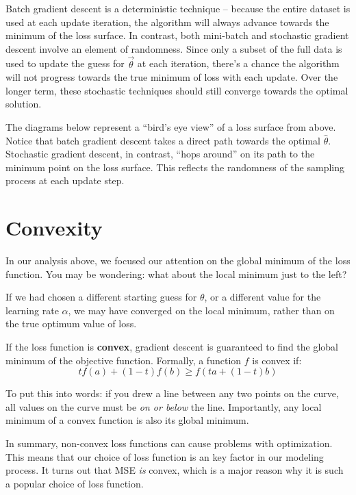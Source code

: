 \documentclass[
  letterpaper,
  DIV=11,
  numbers=noendperiod]{scrreprt}
\begin{document}
Batch gradient descent is a deterministic technique -- because the
entire dataset is used at each update iteration, the algorithm will
always advance towards the minimum of the loss surface. In contrast,
both mini-batch and stochastic gradient descent involve an element of
randomness. Since only a subset of the full data is used to update the
guess for \(\vec{\theta}\) at each iteration, there's a chance the
algorithm will not progress towards the true minimum of loss with each
update. Over the longer term, these stochastic techniques should still
converge towards the optimal solution.

The diagrams below represent a ``bird's eye view'' of a loss surface
from above. Notice that batch gradient descent takes a direct path
towards the optimal \(\hat{\theta}\). Stochastic gradient descent, in
contrast, ``hops around'' on its path to the minimum point on the loss
surface. This reflects the randomness of the sampling process at each
update step.

\hypertarget{convexity}{%
\section{Convexity}\label{convexity}}

In our analysis above, we focused our attention on the global minimum of
the loss function. You may be wondering: what about the local minimum
just to the left?

If we had chosen a different starting guess for \(\theta\), or a
different value for the learning rate \(\alpha\), we may have converged
on the local minimum, rather than on the true optimum value of loss.

If the loss function is \textbf{convex}, gradient descent is guaranteed
to find the global minimum of the objective function. Formally, a
function \(f\) is convex if: \[tf(a) + (1-t)f(b) \geq f(ta + (1-t)b)\]

To put this into words: if you drew a line between any two points on the
curve, all values on the curve must be \emph{on or below} the line.
Importantly, any local minimum of a convex function is also its global
minimum.

In summary, non-convex loss functions can cause problems with
optimization. This means that our choice of loss function is an key
factor in our modeling process. It turns out that MSE \emph{is} convex,
which is a major reason why it is such a popular choice of loss
function.

\end{document}
